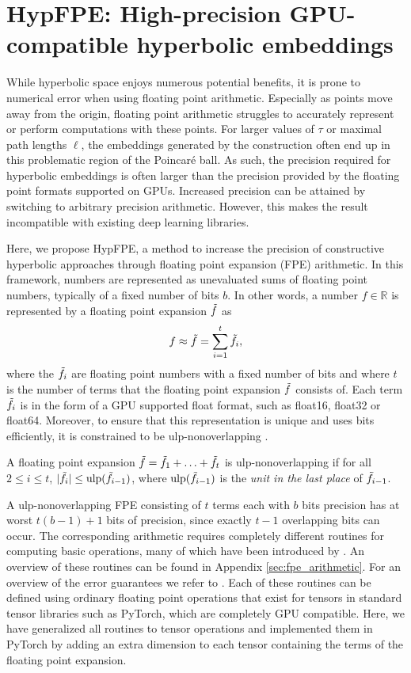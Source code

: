 \section{HypFPE: High-precision GPU-compatible hyperbolic embeddings}
\label{sec:method_float_expansions}
While hyperbolic space enjoys numerous potential benefits, it is prone to numerical error when using floating point arithmetic. Especially as points move away from the origin, floating point arithmetic struggles to accurately represent or perform computations with these points. For larger values of $\tau$ or maximal path lengths $\ell$, the embeddings generated by the construction often end up in this problematic region of the Poincaré ball. As such, the precision required for hyperbolic embeddings is often larger than the precision provided by the floating point formats supported on GPUs. Increased precision can be attained by switching to arbitrary precision arithmetic. However, this makes the result incompatible with existing deep learning libraries.

Here, we propose HypFPE, a method to increase the precision of constructive hyperbolic approaches through floating point expansion (FPE) arithmetic. In this framework, numbers are represented as unevaluated sums of floating point numbers, typically of a fixed number of bits $b$. In other words, a number $f \in \mathbb{R}$ is represented by a floating point expansion $\tilde{f}$ as
\begin{equation}
    f \approx \tilde{f} = \sum_{i=1}^t \tilde{f}_i,
\end{equation}
where the $\tilde{f}_i$ are floating point numbers with a fixed number of bits and where $t$ is the number of terms that the floating point expansion $\tilde{f}$ consists of. Each term $\tilde{f}_i$ is in the form of a GPU supported float format, such as float16, float32 or float64. Moreover, to ensure that this representation is unique and uses bits efficiently, it is constrained to be ulp-nonoverlapping \citep{popescu2017towards}.
\begin{definition}
    A floating point expansion $\tilde{f} = \tilde{f}_1 + \ldots + \tilde{f}_t$ is ulp-nonoverlapping if for all $2 \leq i \leq t$, $|\tilde{f}_i| \leq \text{ulp}(\tilde{f}_{i - 1})$, where $\text{ulp}(\tilde{f}_{i - 1})$ is the \textit{unit in the last place} of $\tilde{f}_{i - 1}$.
\end{definition}
A ulp-nonoverlapping FPE consisting of $t$ terms each with $b$ bits precision has at worst $t(b-1) + 1$ bits of precision, since exactly $t - 1$ overlapping bits can occur.
The corresponding arithmetic requires completely different routines for computing basic operations, many of which have been introduced by \citep{joldes2014computation, joldes2015arithmetic, muller2016new, popescu2017towards}. An overview of these routines can be found in Appendix \ref{sec:fpe_arithmetic}. For an overview of the error guarantees we refer to \citep{popescu2017towards}. Each of these routines can be defined using ordinary floating point operations that exist for tensors in standard tensor libraries such as PyTorch, which are completely GPU compatible. Here, we have generalized all routines to tensor operations and implemented them in PyTorch by adding an extra dimension to each tensor containing the terms of the floating point expansion.

